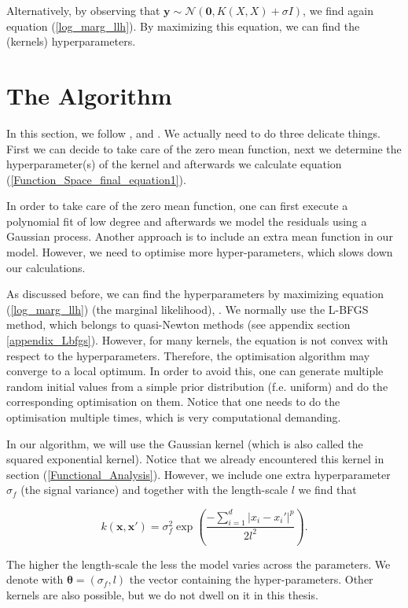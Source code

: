 \documentclass[12pt,a4paper,oneside]{book}
\begin{document}
Alternatively, by observing that $\bm{y} \sim \mathcal{N}(\bm{0},K(X,X) + \sigma I)$, we find again equation (\ref{log_marg_llh}). By maximizing this equation, we can find the (kernels) hyperparameters. 


\section{The Algorithm}

In this section, we follow \cite{GPRbook}, \cite{de2018machine} and \cite{chen2018priors}. We actually need to do three delicate things. First we can decide to take care of the zero mean function, next we determine the hyperparameter(s) of the kernel and afterwards we calculate equation (\ref{Function_Space_final_equation1}). 

In order to take care of the zero mean function, one can first execute a polynomial fit of low degree and afterwards we model the residuals using a Gaussian process. Another approach is to include an extra mean function in our model. However, we need to optimise more hyper-parameters, which slows down our calculations. 

As discussed before, we can find the hyperparameters by maximizing equation (\ref{log_marg_llh}) (the marginal likelihood), . We normally use the L-BFGS method, which belongs to quasi-Newton methods (see appendix section \ref{appendix_Lbfgs}). However, for many kernels, the equation is not convex with respect to the hyperparameters. Therefore, the optimisation algorithm may converge to a local optimum. In order to avoid this, one can generate multiple random initial values from a simple prior distribution (f.e. uniform) and do the corresponding optimisation on them. Notice that one needs to do the optimisation multiple times, which is very computational demanding.

In our algorithm, we will use the Gaussian kernel (which is also called the squared exponential kernel). Notice that we already encountered this kernel in section (\ref{Functional_Analysis}). However, we include one extra hyperparameter $\sigma_f$ (the signal variance) and together with the length-scale $l$ we find that 

\begin{equation}
k(\bm{x},\bm{x}') = \sigma_f^2 \exp \left( \dfrac{- \sum\nolimits_{i=1}^{d} | x_i - x_i'|^p}{2l^2} \right).
\end{equation}

The higher the length-scale the less the model varies across the parameters. We denote with $\bm{\theta} = (\sigma_f, l)$ the vector containing the hyper-parameters. Other kernels are also possible, but we do not dwell on it in this thesis. 
\end{document}
